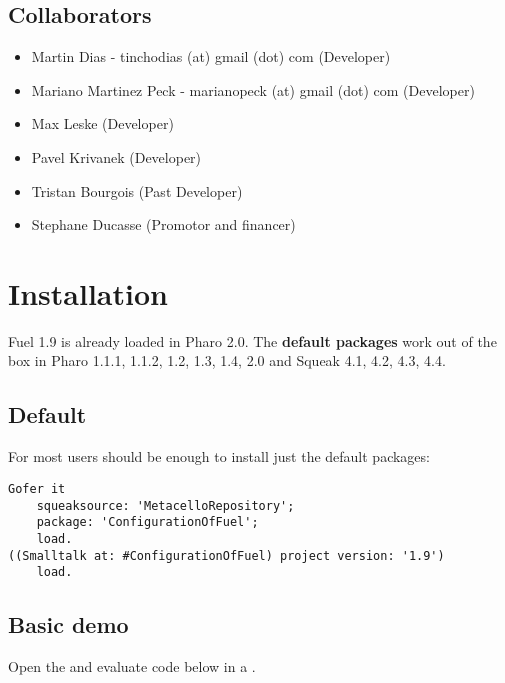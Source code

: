 \documentclass[a4paper,10pt,twoside]{book}
\begin{document}
\subsection{Collaborators}
\begin{itemize}
\item  Martin Dias - tinchodias (at) gmail (dot) com (Developer)
\item  Mariano Martinez Peck - marianopeck (at) gmail (dot) com (Developer)
\item  Max Leske (Developer)
\item  Pavel Krivanek (Developer)
\item  Tristan Bourgois (Past Developer)
\item  Stephane Ducasse (Promotor and financer)
\end{itemize}




\section{Installation}

\label{Installation}

Fuel 1.9 is already loaded in Pharo 2.0. The \textbf{default packages} work out of the box in Pharo 1.1.1, 1.1.2, 1.2, 1.3, 1.4, 2.0 and Squeak 4.1, 4.2, 4.3, 4.4.

\subsection{Default}

For most users should be enough to install just the default packages:

\begin{lstlisting}
Gofer it
    squeaksource: 'MetacelloRepository';
    package: 'ConfigurationOfFuel';
    load.
((Smalltalk at: #ConfigurationOfFuel) project version: '1.9') 
    load.
\end{lstlisting}


\subsection{Basic demo}

Open the  and evaluate code below in a .
\end{document}
